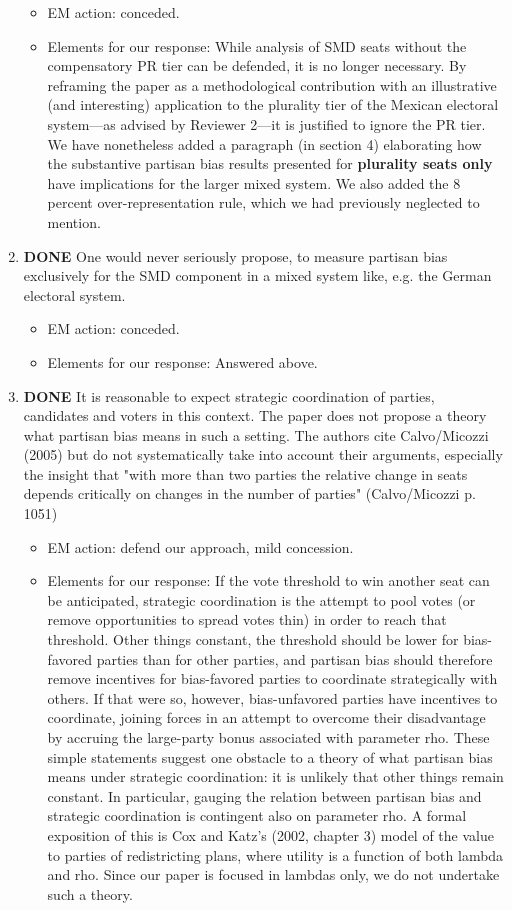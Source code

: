 \documentclass{article}
\begin{document}
\begin{enumerate}
\label{sec:orgheadline23}
\begin{itemize}
\item EM action: conceded.
\item Elements for our response: While analysis of SMD seats without the compensatory PR tier can be defended, it is no longer necessary. By reframing the paper as a methodological contribution with an illustrative (and interesting) application to the plurality tier of the Mexican electoral system---as advised by Reviewer 2---it is justified to ignore the PR tier. We have nonetheless added a paragraph (in section 4) elaborating how the substantive partisan bias results presented for \textbf{plurality seats only} have implications for the larger mixed system. We also added the 8 percent over-representation rule, which we had previously neglected to mention.
\end{itemize}
\item {\bfseries\sffamily DONE} One would never seriously propose, to measure partisan bias exclusively for the SMD component in a mixed system like, e.g. the German electoral system.
\label{sec:orgheadline24}
\begin{itemize}
\item EM action: conceded.
\item Elements for our response: Answered above.
\end{itemize}
\item {\bfseries\sffamily DONE} It is reasonable to expect strategic coordination of parties, candidates and voters in this context. The paper does not propose a theory what partisan bias means in such a setting. The authors cite Calvo/Micozzi (2005) but do not systematically take into account their arguments, especially the insight that "with more than two parties the relative change in seats depends critically on changes in the number of parties" (Calvo/Micozzi p. 1051)
\label{sec:orgheadline25}
\begin{itemize}
\item EM action: defend our approach, mild concession.
\item Elements for our response: If the vote threshold to win another seat can be anticipated, strategic coordination is the attempt to pool votes (or remove opportunities to spread votes thin) in order to reach that threshold. Other things constant, the threshold should be lower for bias-favored parties than for other parties, and partisan bias should therefore remove incentives for bias-favored parties to coordinate strategically with others. If that were so, however, bias-unfavored parties have incentives to coordinate, joining forces in an attempt to overcome their disadvantage by accruing the large-party bonus associated with parameter rho. These simple statements suggest one obstacle to a theory of what partisan bias means under strategic coordination: it is unlikely that other things remain constant. In particular, gauging the relation between partisan bias and strategic coordination is contingent also on parameter rho. A formal exposition of this is Cox and Katz's (2002, chapter 3) model of the value to parties of redistricting plans, where utility is a function of both lambda and rho. Since our paper is focused in lambdas only, we do not undertake such a theory.

\end{itemize}
\end{enumerate}
\end{document}
